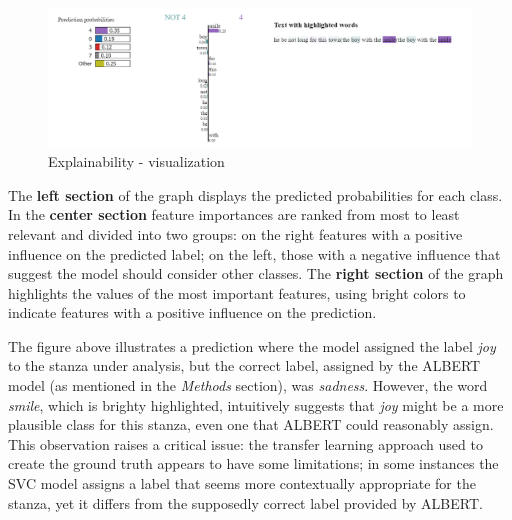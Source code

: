 \begin{figure}[H]
    \centering
    \includegraphics[scale= 0.55]{pictures/expl.png}
    \caption{Explainability - visualization}
    \label{fig:expl}
\end{figure}

The \textbf{left section} of the graph displays the
predicted probabilities for each class. In the \textbf{center section}
feature importances are ranked from most to least relevant and divided into two
groups: on the right
features with a positive influence on the predicted label; on the left, those
with a negative influence that suggest the model should consider other classes.
The \textbf{right section} of the graph highlights the values of the most important
features, using bright colors to indicate features with a positive influence on the
prediction.

The figure above illustrates a prediction where the model assigned the label \textit{joy} to the stanza under analysis, but the correct label, assigned by the ALBERT model (as mentioned in the \textit{Methods} section), was \textit{sadness}.
However, the word \textit{smile}, which is brighty highlighted, intuitively suggests that \textit{joy} might be a more plausible class for this stanza, even one that ALBERT could reasonably assign. 
This observation raises a critical issue: the transfer learning approach used to create the ground truth appears to have some limitations; in some instances the SVC model assigns a label that seems more contextually appropriate for the stanza, 
yet it differs from the supposedly correct label provided by ALBERT.\\

